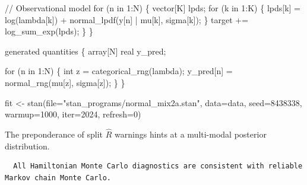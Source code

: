\documentclass[
  letterpaper,
  DIV=11,
  numbers=noendperiod]{scrartcl}
\newenvironment{Shaded}{\begin{snugshade}}{\end{snugshade}}
\newcommand{\AttributeTok}[1]{\textcolor[rgb]{0.40,0.45,0.13}{#1}}
\newcommand{\CommentTok}[1]{\textcolor[rgb]{0.37,0.37,0.37}{#1}}
\newcommand{\ControlFlowTok}[1]{\textcolor[rgb]{0.00,0.23,0.31}{#1}}
\newcommand{\DataTypeTok}[1]{\textcolor[rgb]{0.68,0.00,0.00}{#1}}
\newcommand{\DecValTok}[1]{\textcolor[rgb]{0.68,0.00,0.00}{#1}}
\newcommand{\FunctionTok}[1]{\textcolor[rgb]{0.28,0.35,0.67}{#1}}
\newcommand{\KeywordTok}[1]{\textcolor[rgb]{0.00,0.23,0.31}{#1}}
\newcommand{\NormalTok}[1]{\textcolor[rgb]{0.00,0.23,0.31}{#1}}
\newcommand{\OtherTok}[1]{\textcolor[rgb]{0.00,0.23,0.31}{#1}}
\newcommand{\SpecialCharTok}[1]{\textcolor[rgb]{0.37,0.37,0.37}{#1}}
\newcommand{\StringTok}[1]{\textcolor[rgb]{0.13,0.47,0.30}{#1}}
\begin{document}
\begin{codelisting}
\begin{Shaded}
\begin{Highlighting}[]
  \CommentTok{// Observational model}
  \ControlFlowTok{for}\NormalTok{ (n }\ControlFlowTok{in} \DecValTok{1}\NormalTok{:N) \{}
    \DataTypeTok{vector}\NormalTok{[K] lpds;}
    \ControlFlowTok{for}\NormalTok{ (k }\ControlFlowTok{in} \DecValTok{1}\NormalTok{:K) \{}
\NormalTok{      lpds[k] = log(lambda[k]) + normal\_lpdf(y[n] | mu[k], sigma[k]);}
\NormalTok{    \}}
    \KeywordTok{target +=}\NormalTok{ log\_sum\_exp(lpds);}
\NormalTok{  \}}
\NormalTok{\}}

\KeywordTok{generated quantities}\NormalTok{ \{}
  \DataTypeTok{array}\NormalTok{[N] }\DataTypeTok{real}\NormalTok{ y\_pred;}

  \ControlFlowTok{for}\NormalTok{ (n }\ControlFlowTok{in} \DecValTok{1}\NormalTok{:N) \{}
    \DataTypeTok{int}\NormalTok{ z = categorical\_rng(lambda);}
\NormalTok{    y\_pred[n] = normal\_rng(mu[z], sigma[z]);}
\NormalTok{  \}}
\NormalTok{\}}
\end{Highlighting}
\end{Shaded}

\end{codelisting}

\begin{Shaded}
\begin{Highlighting}[]
\NormalTok{fit }\OtherTok{\textless{}{-}} \FunctionTok{stan}\NormalTok{(}\AttributeTok{file=}\StringTok{"stan\_programs/normal\_mix2a.stan"}\NormalTok{,}
            \AttributeTok{data=}\NormalTok{data, }\AttributeTok{seed=}\DecValTok{8438338}\NormalTok{,}
            \AttributeTok{warmup=}\DecValTok{1000}\NormalTok{, }\AttributeTok{iter=}\DecValTok{2024}\NormalTok{, }\AttributeTok{refresh=}\DecValTok{0}\NormalTok{)}
\end{Highlighting}
\end{Shaded}

The preponderance of split \(\hat{R}\) warnings hints at a multi-modal
posterior distribution.

\begin{Shaded}
\end{Shaded}

\begin{verbatim}
  All Hamiltonian Monte Carlo diagnostics are consistent with reliable
Markov chain Monte Carlo.
\end{verbatim}
\end{document}
